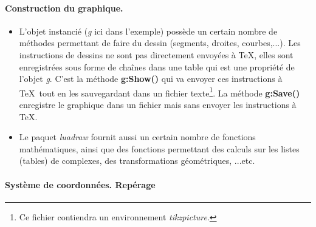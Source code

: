 \paragraph{Construction du graphique.}

\begin{itemize}
    \item L'objet instancié (\emph{g} ici dans l'exemple) possède un certain nombre de méthodes permettant de faire du dessin (segments, droites, courbes,...). Les instructions de dessins ne sont pas directement envoyées à \TeX, elles sont enregistrées sous forme de chaînes dans une table qui est une propriété de l'objet \emph{g}. C'est la méthode \textbf{g:Show()} qui va envoyer ces instructions à \TeX\ tout en les sauvegardant dans un fichier texte\footnote{Ce fichier contiendra un environnement \emph{tikzpicture}.}. La méthode \textbf{g:Save()} enregistre le graphique dans un fichier mais sans envoyer les instructions à \TeX.
    \item Le paquet \emph{luadraw} fournit aussi un certain nombre de fonctions mathématiques, ainsi que des fonctions permettant des calculs sur les listes (tables) de complexes, des transformations géométriques, ...etc.
\end{itemize}


\paragraph{Système de coordonnées. Repérage}

